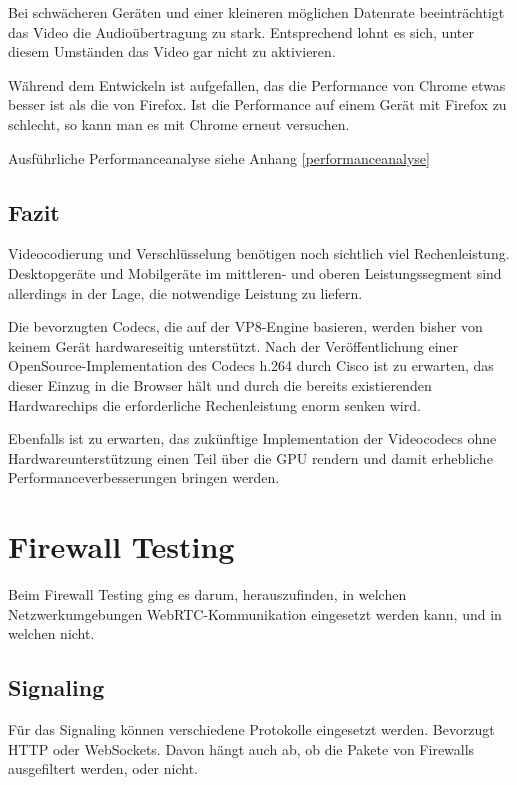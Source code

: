 		\vspace{0.5cm}
		Bei schwächeren Geräten und einer kleineren möglichen Datenrate beeinträchtigt das Video die Audioübertragung zu stark. Entsprechend lohnt es sich, unter diesem Umständen das Video gar nicht zu aktivieren.
		
		Während dem Entwickeln ist aufgefallen, das die Performance von Chrome etwas besser ist als die von Firefox. Ist die Performance auf einem Gerät mit Firefox zu schlecht, so kann man es mit Chrome erneut versuchen.
			
		Ausführliche Performanceanalyse siehe Anhang \ref{performanceanalyse}
	
	\section{Fazit}
		Videocodierung und Verschlüsselung benötigen noch sichtlich viel Rechenleistung. Desktopgeräte und Mobilgeräte im mittleren- und oberen Leistungssegment sind allerdings in der Lage, die notwendige Leistung zu liefern.
		
		Die bevorzugten Codecs, die auf der VP8-Engine basieren, werden bisher von keinem Gerät hardwareseitig unterstützt. Nach der Veröffentlichung einer OpenSource-Implementation des Codecs h.264
		durch Cisco ist zu erwarten, das dieser Einzug in die Browser hält und durch die bereits existierenden Hardwarechips die erforderliche Rechenleistung enorm senken wird.
			
		Ebenfalls ist zu erwarten, das zukünftige Implementation der Videocodecs ohne Hardwareunterstützung einen Teil über die GPU rendern und damit erhebliche Performanceverbesserungen bringen werden.
			
	
	
\chapter{Firewall Testing}
	Beim Firewall Testing ging es darum, herauszufinden, in welchen Netzwerkumgebungen WebRTC-Kommunikation eingesetzt werden kann, und in welchen nicht.
	
	\section{Signaling}
		Für das Signaling können verschiedene Protokolle eingesetzt werden. Bevorzugt HTTP oder WebSockets. Davon hängt auch ab, ob die Pakete von Firewalls ausgefiltert werden, oder nicht.
		

